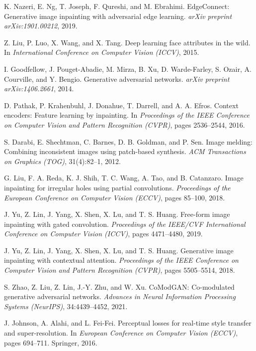 \documentclass[10pt,twocolumn,letterpaper]{article}
\begin{document}
\begin{thebibliography}{10}
K. Nazeri, E. Ng, T. Joseph, F. Qureshi, and M. Ebrahimi.
EdgeConnect: Generative image inpainting with adversarial edge learning.
\textit{arXiv preprint arXiv:1901.00212}, 2019.

Z. Liu, P. Luo, X. Wang, and X. Tang.
Deep learning face attributes in the wild.
In \textit{International Conference on Computer Vision (ICCV)}, 2015.

I. Goodfellow, J. Pouget-Abadie, M. Mirza, B. Xu, D. Warde-Farley, S. Ozair, A. Courville, and Y. Bengio.
Generative adversarial networks.
\textit{arXiv preprint arXiv:1406.2661}, 2014.

D. Pathak, P. Krahenbuhl, J. Donahue, T. Darrell, and A. A. Efros.
Context encoders: Feature learning by inpainting.
In \textit{Proceedings of the IEEE Conference on Computer Vision and Pattern Recognition (CVPR)}, pages 2536–2544, 2016.

S. Darabi, E. Shechtman, C. Barnes, D. B. Goldman, and P. Sen.
Image melding: Combining inconsistent images using patch-based synthesis.
\textit{ACM Transactions on Graphics (TOG)}, 31(4):82–1, 2012.

G. Liu, F. A. Reda, K. J. Shih, T. C. Wang, A. Tao, and B. Catanzaro.  
Image inpainting for irregular holes using partial convolutions.  
\textit{Proceedings of the European Conference on Computer Vision (ECCV)}, pages 85--100, 2018.

J. Yu, Z. Lin, J. Yang, X. Shen, X. Lu, and T. S. Huang.  
Free-form image inpainting with gated convolution.  
\textit{Proceedings of the IEEE/CVF International Conference on Computer Vision (ICCV)}, pages 4471--4480, 2019.

J. Yu, Z. Lin, J. Yang, X. Shen, X. Lu, and T. S. Huang.  
Generative image inpainting with contextual attention.  
\textit{Proceedings of the IEEE Conference on Computer Vision and Pattern Recognition (CVPR)}, pages 5505--5514, 2018.

S. Zhao, Z. Liu, Z. Lin, J.-Y. Zhu, and W. Xu.  
CoModGAN: Co-modulated generative adversarial networks.  
\textit{Advances in Neural Information Processing Systems (NeurIPS)}, 34:4439--4452, 2021.

J. Johnson, A. Alahi, and L. Fei-Fei.
Perceptual losses for real-time style transfer and super-resolution.
In \textit{European Conference on Computer Vision (ECCV)}, pages 694–711. Springer, 2016.


\end{thebibliography}
\end{document}
